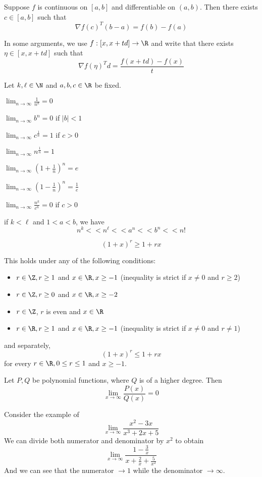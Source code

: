 Suppose $f$ is continuous on $[a,b]$ and differentiable on $(a,b)$.
Then there exists $c\in[a,b]$ such that
$$
	\nabla f(c)^T(b-a)=f(b)-f(a)
$$

In some arguments, we use $f:[x,x+td]\to\R$ and write that there
exists $\eta\in[x,x+td]$ such that
$$
	\nabla f(\eta)^Td=\frac{f(x+td)-f(x)}t
$$

\label{ffc8953}

Let $k,\ell\in\N$ and $a,b,c\in\R$ be fixed.
\begin{enumerata}
	\def\li{\displaystyle\lim_{n\to\infty}}
	\item $\li\frac1{n^k}=0$
	\item $\li b^n=0$ \quad if \quad $|b|<1$
	\item $\li c^{\frac1n}=1$ \quad if \quad $c>0$
	\item $\li n^{\frac1n}=1$
	\item $\li \left(1+\frac1n\right)^n=e$
	\item $\li \left(1-\frac1n\right)^n=\frac1e$
	\item $\li \frac{n^k}{c^n}=0$ \quad if \quad $c>0$
\end{enumerata}

if $k<\ell$ and $1<a<b$, we have
$$
	n^k << n^\ell << a^n << b^n << n!
$$

\label{d44713f}
$$
	(1+x)^r\geq 1+rx
$$

This holds under any of the following conditions:
\begin{itemize}
	\item $r\in\Z,r\geq1$ and $x\in\R,x\geq-1$ (inequality is strict if
	      $x\neq0$ and $r\geq2$)
	\item $r\in\Z,r\geq0$ and $x\in\R,x\geq-2$
	\item $r\in\Z$, $r$ is even and $x\in\R$
	\item $r\in\R,r\geq1$ and $x\in\R,x\geq-1$ (inequality is strict if
	      $x\neq0$ and $r\neq1$)
\end{itemize}

and separately,
$$
	(1+x)^r\leq 1+rx
$$
for every $r\in\R,0\leq r\leq 1$ and $x\geq-1$.

\label{ccfddb1}

Let $P,Q$ be polynomial functions, where $Q$ is of a higher degree.
Then
$$
	\lim_{x\to\infty}\frac{P(x)}{Q(x)}=0
$$

\begin{compute}
	Consider the example of
	$$
		\lim_{x\to\infty}\frac{x^2 - 3x}{x^3 + 2x + 5}
	$$
	We can divide both numerator and denominator by $x^2$ to obtain
	$$
		\lim_{x\to\infty}\frac{1 - \frac3x}{x + \frac2x + \frac5{x^2}}
	$$
	And we can see that the numerator $\to1$ while the denominator
	$\to\infty$.
\end{compute}

